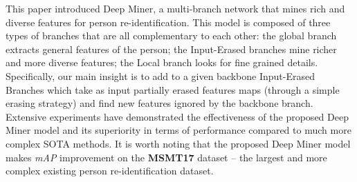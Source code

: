 \documentclass[final]{cvpr}
\begin{document}
This paper introduced Deep Miner, a multi-branch network that mines rich and diverse features for person re-identification. This model is composed of three types of branches that are all complementary to each other: the global branch extracts general features of the person; the Input-Erased branches mine richer and more diverse features; the Local branch looks for fine grained details. Specifically, our main insight is to add to a given backbone Input-Erased Branches which take as input partially erased features maps (through a simple erasing strategy) and find new features ignored by the backbone branch. Extensive experiments have demonstrated the effectiveness of the proposed Deep Miner model and its superiority in terms of performance compared to much more complex SOTA methods. It is worth noting that the proposed Deep Miner model makes  \textit{mAP} improvement on the \textbf{MSMT17} dataset -- the largest and more complex existing person re-identification dataset.  


\onecolumn
\begin{multicols}{1}
\vfill\pagebreak
{\small


}
\end{multicols}
\end{document}
